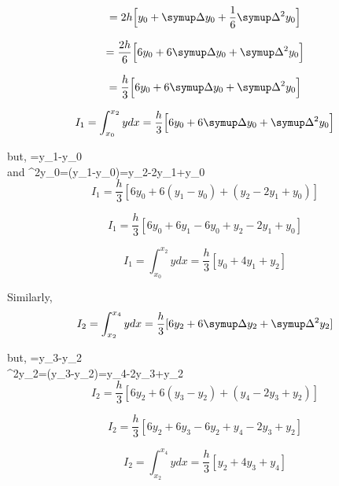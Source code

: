 \documentclass[a4paper,12pt]{report}
\numberwithin{equation}{section}
\begin{document}
\begin{equation*}
=2h\Big[y_0+\symup\Delta{y_0}+\frac{1}{6}\symup\Delta^2{y_0}\Big]
\end{equation*}

\begin{equation*}
=\frac{2h}{6}\Big[6y_0+6\symup\Delta{y_0}+\symup\Delta^2{y_0}\Big]
\end{equation*}

\begin{equation*}
=\frac{h}{3}\Big[6y_0+6\symup\Delta{y_0}+\symup\Delta^2{y_0}\Big]
\end{equation*}

\begin{equation*}
I_1=\int_{x_0}^{x_2}ydx=\frac{h}{3}\Big[6y_0+6\symup\Delta{y_0}+\symup\Delta^2{y_0}\Big]
\end{equation*}

but, \symup{}=y_1-y_0\\
and \symup\Delta^2{y_0}=\symup\Delta(y_1-y_0)=y_2-2y_1+y_0\\

\begin{equation*}
I_1=\frac{h}{3}[6y_0+6(y_1-y_0)+(y_2-2y_1+y_0)]
\end{equation*}

\begin{equation*}
I_1=\frac{h}{3}[6y_0+6y_1-6y_0+y_2-2y_1+y_0]
\end{equation*}

\begin{equation*}
I_1=\int_{x_0}^{x_2}ydx=\frac{h}{3}[y_0+4y_1+y_2]
\end{equation*}

Similarly,
\begin{equation*}
I_2=\int_{x_2}^{x_4}ydx=\frac{h}{3}[6y_2+6\symup\Delta{y_2}+\symup\Delta^2{y_2}]
\end{equation*}

but, \symup{}=y_3-y_2\\
 \symup\Delta^2{y_2}=\symup\Delta(y_3-y_2)=y_4-2y_3+y_2\\

\begin{equation*}
I_2=\frac{h}{3}[6y_2+6(y_3-y_2)+(y_4-2y_3+y_2)]
\end{equation*}

\begin{equation*}
I_2=\frac{h}{3}[6y_2+6y_3-6y_2+y_4-2y_3+y_2]
\end{equation*}

\begin{equation*}
I_2=\int_{x_2}^{x_4}ydx=\frac{h}{3}[y_2+4y_3+y_4]
\end{equation*}
\end{document}
